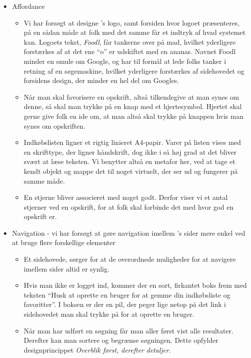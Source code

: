 \begin{itemize}
\item Affordance
  \begin{itemize}
  \item Vi har forsøgt at designe \Foodl's logo, samt forsiden hvor logoet præsenteres, på en sådan måde at folk med det samme får et indtryk af hvad systemet kan. Logoets tekst, \textit{Foodl}, får tankerne over på mad, hvilket yderligere forstærkes af at det ene ``o'' er udskiftet med en ananas. Navnet Foodl minder en smule om Google, og har til formål at lede folks tanker i retning af en søgemaskine, hvilket yderligere forstærkes af sidehovedet og forsidens design, der minder en hel del om Googles.  
  \item Når man skal favorisere en opskrift, altså tilkendegive at man synes om denne, så skal man trykke på en knap med et  hjertesymbol. Hjertet skal gerne give folk en ide om, at man altså skal trykke på knappen hvis man synes om opskriften.
  \item Indkøbslisten ligner et rigtig linieret A4-papir. Varer på listen vises med en skrifttype, der ligner håndskrift, dog ikke i så høj grad at det bliver svært at læse teksten. Vi benytter altså en metafor her, ved at tage et kendt objekt og mappe det til noget virtuelt, der ser ud og fungerer på samme måde.
  \item En stjerne bliver associeret med noget godt. Derfor viser vi et antal stjerner ved en opskrift, for at folk skal forbinde det med hvor god en opskrift er.
  \end{itemize}
  
\item Navigation - vi har forsøgt at gøre navigation imellem \Foodl's sider mere enkel ved at bruge flere forskellige elementer
  \begin{itemize}
  \item Et sidehovede, sørger for at de overordnede muligheder for at navigere imellem sider altid er synlig.
  \item Hvis man ikke er logget ind, kommer der en sort, firkantet boks frem med teksten “Husk at oprette en bruger for at gemme din indkøbsliste og favoritter”. I boksen er der en pil, der peger lige netop på det link i sidehovedet man skal trykke på for at oprette en bruger.
  \item Når man har udført en søgning får man aller først vist alle resultater. Derefter kan man sortere og begrænse søgningen. Dette opfylder designprincippet \textit{Overblik først, derefter detaljer}.
  \end{itemize}
  

\end{itemize}
